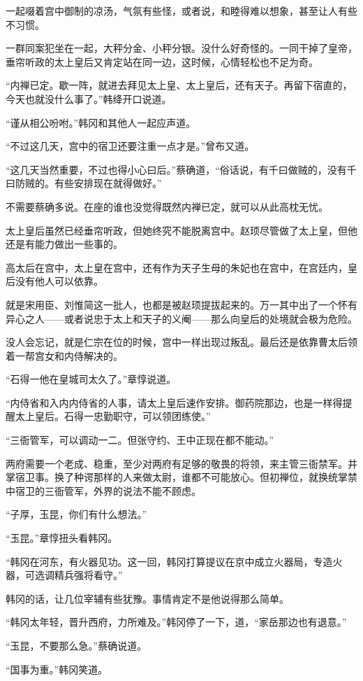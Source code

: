 一起啜着宫中御制的凉汤，气氛有些怪，或者说，和睦得难以想象，甚至让人有些不习惯。

一群同案犯坐在一起，大秤分金、小秤分银。没什么好奇怪的。一同干掉了皇帝，垂帘听政的太上皇后又肯定站在同一边，这时候，心情轻松也不足为奇。

“内禅已定。歇一阵，就进去拜见太上皇、太上皇后，还有天子。再留下宿直的，今天也就没什么事了。”韩绛开口说道。

“谨从相公吩咐。”韩冈和其他人一起应声道。

“不过这几天，宫中的宿卫还要注重一点才是。”曾布又道。

“这几天当然重要，不过也得小心曰后。”蔡确道，“俗话说，有千曰做贼的，没有千曰防贼的。有些安排现在就得做好。”

不需要蔡确多说。在座的谁也没觉得既然内禅已定，就可以从此高枕无忧。

太上皇后虽然已经垂帘听政，但她终究不能脱离宫中。赵顼尽管做了太上皇，但他还是有能力做出一些事的。

高太后在宫中，太上皇在宫中，还有作为天子生母的朱妃也在宫中，在宫廷内，皇后没有他人可以依靠。

就是宋用臣、刘惟简这一批人，也都是被赵顼提拔起来的。万一其中出了一个怀有异心之人——或者说忠于太上和天子的义阉——那么向皇后的处境就会极为危险。

没人会忘记，就是仁宗在位的时候，宫中一样出现过叛乱。最后还是依靠曹太后领着一帮宫女和内侍解决的。

“石得一他在皇城司太久了。”章惇说道。

“内侍省和入内内侍省的人事，请太上皇后速作安排。御药院那边，也是一样得提醒太上皇后。石得一忠勤职守，可以领团练使。”

“三衙管军，可以调动一二。但张守约、王中正现在都不能动。”

两府需要一个老成、稳重，至少对两府有足够的敬畏的将领，来主管三衙禁军。并掌宿卫事。换了种谔那样的人来做太尉，谁都不可能放心。但初禅位，就换统掌禁中宿卫的三衙管军，外界的说法不能不顾虑。

“子厚，玉昆，你们有什么想法。”

“玉昆。”章惇扭头看韩冈。

“韩冈在河东，有火器见功。这一回，韩冈打算提议在京中成立火器局，专造火器，可选调精兵强将看守。”

韩冈的话，让几位宰辅有些犹豫。事情肯定不是他说得那么简单。

“韩冈太年轻，晋升西府，力所难及。”韩冈停了一下，道，“家岳那边也有退意。”

“玉昆，不要那么急。”蔡确说道。

“国事为重。”韩冈笑道。

